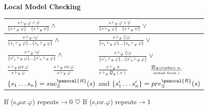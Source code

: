 \documentclass{article}
\newcommand{\Kb}{\pazocal{K}}
\newcommand{\Ib}{\pazocal{I}}
\newcommand{\Sb}{\pazocal{S}}
\newcommand{\Rb}{\pazocal{R}}
\newcommand{\Lb}{\pazocal{L}}
\newcommand{\Hb}{\pazocal{H}}
\newcommand{\Db}{\mathfrak{D}}
\begin{document}
\begin{multicols}{4}
\textbf{Local Model Checking}
\begin{tabular}{|l|l|l|l|}
\hline
\multicolumn{2}{|l|}{\small$\frac{s \vdash_{\Phi} \varphi \wedge \psi}{\{s \vdash_{\Phi} \varphi \} \quad \{s \vdash_{\Phi} \psi\}} \wedge$} & \multicolumn{2}{|l|}{\small$\frac{s \vdash_{\Phi} \varphi \vee \psi}{\{s \vdash_{\Phi} \varphi \} \quad \{s \vdash_{\Phi} \psi\}} \vee $}\\ \hline
\multicolumn{2}{|l|}{\small$\frac{s \vdash_{\Phi} \square \varphi}{\{s_1 \vdash_{\Phi} \varphi\} \dots \{s_n \vdash_{\Phi} \varphi\}} \wedge$}&\multicolumn{2}{|l|}{\small$\frac{s \vdash_{\Phi} \diamondsuit \varphi}{\{s_1 \vdash_{\Phi} \varphi\} \dots \{s_n \vdash_{\Phi} \varphi\}} \vee$} \\
 \hline
\multicolumn{2}{|l|}{\small$\frac{s \vdash_{\Phi} \overleftarrow{\square} \varphi}{\{s'_1 \vdash_{\Phi} \varphi \}\dots \{ s'_n \vdash_{\Phi} \varphi\}} \wedge$} &\multicolumn{2}{|l|}{\small$\frac{s \vdash_{\Phi} \overleftarrow{\diamondsuit} \varphi}{\{s'_1 \vdash_{\Phi} \varphi \}\dots \{ s'_n \vdash_{\Phi} \varphi\}} \vee$} \\
 \hline
$\frac{s \vdash_{\Phi} \mu x.\varphi}{s \vdash_{\Phi} \varphi}$ &$\frac{s \vdash_{\Phi} \nu x.\varphi}{s \vdash_{\Phi} \varphi}$&$\frac{s \vdash_{\Phi} x}{s \vdash_{\Phi} \Db_{\Phi}(x)}$&$\frac{\Db_{\Phi}\text{\tiny (replace w.}}{\text{\tiny initial form.)}}$\\
 \hline
\multicolumn{4}{|l|}{$\{s_1 \dots s_n \}=suc^{\Rb}_{\exists}({s})$ and $\{s'_1 \dots s'_n \}=pre^{\Rb}_{\exists}({s})$}\\ \hline 
\end{tabular}
If (s,$\mu x.\varphi$) repeats$\rightarrow$0 $\heartsuit$
If (s,$\nu x.\varphi$) repeats$\rightarrow$1\\


\end{multicols}
\end{document}
